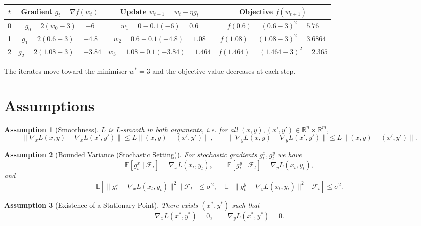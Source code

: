 \documentclass{article}
\newtheorem{assumption}{Assumption}
\newcommand{\E}{\mathbb{E}}
\newcommand{\R}{\mathbb{R}}
\begin{document}
\begin{center}
\begin{tabular}{c|c|c|c}
\(t\) & Gradient \(g_{t}= \nabla f(w_{t})\) & Update \(w_{t+1}=w_{t}-\eta g_{t}\) & Objective \(f(w_{t+1})\)\\ \hline
0 & \(g_{0}=2(w_{0}-3) = -6\) & \(w_{1}=0-0.1(-6)=0.6\) & \(f(0.6)= (0.6-3)^{2}=5.76\)\\
1 & \(g_{1}=2(0.6-3)=-4.8\) & \(w_{2}=0.6-0.1(-4.8)=1.08\) & \(f(1.08)= (1.08-3)^{2}=3.6864\)\\
2 & \(g_{2}=2(1.08-3)=-3.84\) & \(w_{3}=1.08-0.1(-3.84)=1.464\) & \(f(1.464)= (1.464-3)^{2}=2.365\)\\
\end{tabular}
\end{center}
The iterates move toward the minimiser \(w^{*}=3\) and the objective value decreases at each step.

\newpage
\section*{Assumptions}
\begin{assumption}[Smoothness]\label{as:smooth}
\(L\) is \(L\)-smooth in both arguments, i.e. for all \((x,y),(x',y')\in\R^{n}\times\R^{m}\),
\[
\|\nabla_{x}L(x,y)-\nabla_{x}L(x',y')\|\le L\big\|(x,y)-(x',y')\big\|,
\qquad
\|\nabla_{y}L(x,y)-\nabla_{y}L(x',y')\|\le L\big\|(x,y)-(x',y')\big\|.
\tag{A1}
\]
\end{assumption}
\begin{assumption}[Bounded Variance (Stochastic Setting)]\label{as:variance}
For stochastic gradients \(g^{x}_{t},g^{y}_{t}\) we have
\[
\E\!\left[g^{x}_{t}\mid\mathcal{F}_{t}\right]=\nabla_{x}L(x_{t},y_{t}),\qquad
\E\!\left[g^{y}_{t}\mid\mathcal{F}_{t}\right]=\nabla_{y}L(x_{t},y_{t}),
\]
and
\[
\E\!\left[\|g^{x}_{t}-\nabla_{x}L(x_{t},y_{t})\|^{2}\mid\mathcal{F}_{t}\right]\le\sigma^{2},
\quad
\E\!\left[\|g^{y}_{t}-\nabla_{y}L(x_{t},y_{t})\|^{2}\mid\mathcal{F}_{t}\right]\le\sigma^{2}.
\tag{A2}
\]
\end{assumption}
\begin{assumption}[Existence of a Stationary Point]\label{as:exist}
There exists \((x^{*},y^{*})\) such that
\[
\nabla_{x}L(x^{*},y^{*})=0,\qquad \nabla_{y}L(x^{*},y^{*})=0 .
\tag{A3}
\]
\end{assumption}
\end{document}
